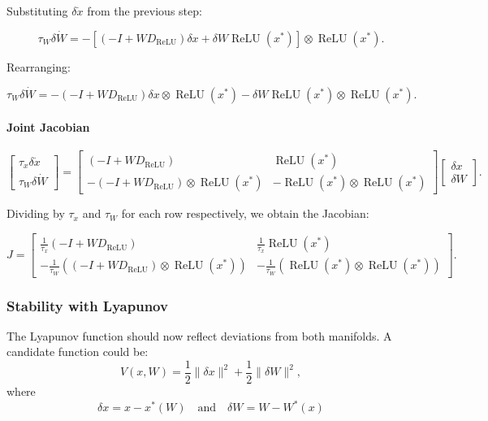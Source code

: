 \documentclass{article}
\theoremstyle{definition} \newtheorem{definition}{Definition}
\theoremstyle{remark} \newtheorem{remark}{Remark}
\newcounter{ct}
\begin{document}
Substituting \( \delta \dot{x} \) from the previous step:

\begin{equation}
    \tau_W \delta \dot{W} = -\left[ (-I + W D_{\operatorname{ReLU}}) \delta x + \delta W \operatorname{ReLU}(x^*) \right] \otimes \operatorname{ReLU}(x^*).
\end{equation}

Rearranging:

\begin{equation}
    \tau_W \delta \dot{W} = - (-I + W D_{\operatorname{ReLU}}) \delta x \otimes \operatorname{ReLU}(x^*) 
    - \delta W \operatorname{ReLU}(x^*) \otimes \operatorname{ReLU}(x^*).
\end{equation}


\paragraph{Joint Jacobian}
\begin{equation}
\begin{bmatrix}
    \tau_x \delta \dot{x} \\
    \tau_W \delta \dot{W}
\end{bmatrix}
=
\begin{bmatrix}
    (-I + W D_{\operatorname{ReLU}}) & \operatorname{ReLU}(x^*) \\
    -(-I + W D_{\operatorname{ReLU}}) \otimes \operatorname{ReLU}(x^*) & -\operatorname{ReLU}(x^*) \otimes \operatorname{ReLU}(x^*)
\end{bmatrix}
\begin{bmatrix}
    \delta x \\
    \delta W
\end{bmatrix}.
\end{equation}

Dividing by \( \tau_x \) and \( \tau_W \) for each row respectively, we obtain the Jacobian:

\begin{equation}
J =
\begin{bmatrix}
    \frac{1}{\tau_x} (-I + W D_{\operatorname{ReLU}}) & \frac{1}{\tau_x} \operatorname{ReLU}(x^*) \\
    -\frac{1}{\tau_W} ((-I + W D_{\operatorname{ReLU}}) \otimes \operatorname{ReLU}(x^*)) & -\frac{1}{\tau_W} (\operatorname{ReLU}(x^*) \otimes \operatorname{ReLU}(x^*))
\end{bmatrix}.
\end{equation}

\subsubsection{Stability with Lyapunov}
The Lyapunov function should now reflect deviations from both manifolds. A candidate function could be:
\[
V(x, W) = \frac{1}{2} \| \delta x \|^2 + \frac{1}{2} \| \delta W \|^2,
\]
where 
\[
\delta x = x - x^*(W) \quad \text{and} \quad \delta W = W - W^*(x)
\]
\end{document}
